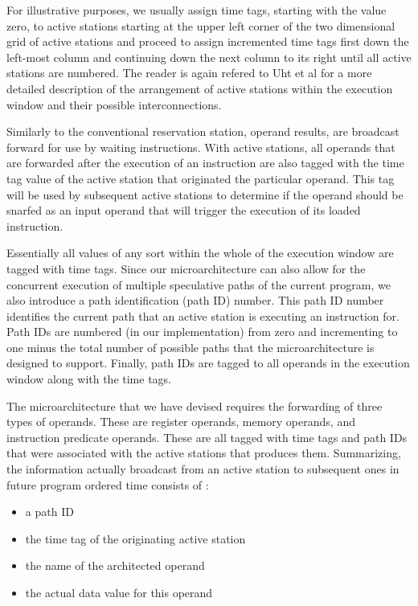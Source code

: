 \documentclass[10pt,dvips]{article}
\begin{document}
For illustrative purposes, we usually assign time tags, starting with the
value zero,
to active stations starting at the upper left corner of the two
dimensional grid of active stations and proceed to assign incremented
time tags first down the left-most column and continuing down the
next column to its right until all active stations are numbered.
The reader is again refered to Uht et al \cite{Uht01} for a more
detailed description of the arrangement of active stations within
the execution window and their possible interconnections.

Similarly to the conventional reservation station, operand results,
are broadcast forward for use by waiting instructions.
With active stations, all operands that are forwarded after the execution
of an instruction are also tagged with the time tag value of the
active station that originated the particular operand.
This tag will be used by subsequent active stations to determine if
the operand should be snarfed as an input operand that will trigger
the execution of its loaded instruction.

Essentially all values of any sort within the whole of the execution
window are tagged with time tags.
Since our microarchitecture can also allow for the concurrent
execution of multiple speculative paths of the current program,
we also introduce a path identification (path ID) number.
This path ID number
identifies the current path that an active station is executing an instruction
for.  
Path IDs are numbered (in our implementation) from zero and
incrementing to one minus the total number of possible paths
that the microarchitecture is designed to support.
Finally, path IDs are tagged to all operands in the execution window
along with the time tags.

The microarchitecture that we have devised requires the
forwarding of three types of operands.  These are register
operands, memory operands, and instruction predicate operands.
These are all tagged with time tags and path IDs that were associated
with the active stations that produces them.
Summarizing, the information 
actually broadcast from an active station to subsequent
ones in future program ordered time consists of :

\begin{itemize}
\item{a path ID}
\item{the time tag of the originating active station}
\item{the name of the architected operand}
\item{the actual data value for this operand}
\end{itemize}   
\end{document}
